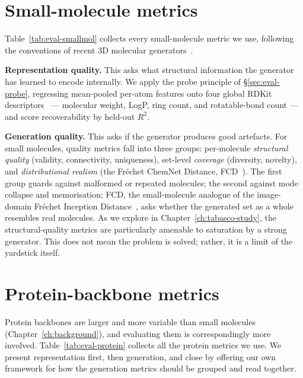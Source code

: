\documentclass[12pt,a4paper,twoside]{report}
\begin{document}
\section{Small-molecule metrics}
\label{sec:eval-small-mol}

Table~\ref{tab:eval-smallmol} collects every small-molecule metric we use, following the conventions of recent 3D molecular generators~\cite{Tabasco,EQGATdiff,SemlaFlow}.

\textbf{Representation quality.} This asks what structural information the generator has learned to encode internally. We apply the probe principle of \S\ref{sec:eval-probe}, regressing mean-pooled per-atom features onto four global RDKit descriptors~\cite{RDKit} --- molecular weight, LogP, ring count, and rotatable-bond count --- and score recoverability by held-out $R^2$.

\textbf{Generation quality.} This asks if the generator produces good artefacts. For small molecules, quality metrics fall into three groups: per-molecule \emph{structural quality} (validity, connectivity, uniqueness), set-level \emph{coverage} (diversity, novelty), and \emph{distributional realism} (the Fr\'echet ChemNet Distance, FCD~\cite{FCD}). The first group guards against malformed or repeated molecules; the second against mode collapse and memorisation; FCD, the small-molecule analogue of the image-domain Fr\'echet Inception Distance~\cite{FID}, asks whether the generated set as a whole resembles real molecules. As we explore in Chapter~\ref{ch:tabasco-study}, the structural-quality metrics are particularly amenable to saturation by a strong generator. This does not mean the problem is solved; rather, it is a limit of the yardstick itself.



\section{Protein-backbone metrics}
\label{sec:eval-protein}

Protein backbones are larger and more variable than small molecules (Chapter~\ref{ch:background}), and evaluating them is correspondingly more involved. Table~\ref{tab:eval-protein} collects all the protein metrics we use. We present representation first, then generation, and close by offering our own framework for how the generation metrics should be grouped and read together.


\end{document}
